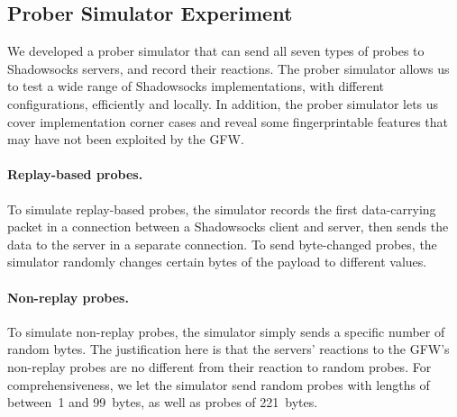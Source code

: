 \documentclass[sigconf,letterpaper]{acmart}
\begin{document}
\subsection{Prober Simulator Experiment}
\label{sec:intention-simulator}

We developed a prober simulator that can send all seven types of probes to Shadowsocks servers, and record their reactions.
The prober simulator allows us to test a wide range of Shadowsocks implementations,
with different configurations, efficiently and locally.
In addition, the prober simulator lets us cover implementation corner cases
and reveal some fingerprintable features that may have not been exploited by the GFW.

\paragraph{Replay-based probes.}
To simulate replay-based probes,
the simulator records the first data-carrying packet in a connection between a Shadowsocks client and server,
then sends the data to the server in a separate connection.
To send byte-changed probes,
the simulator randomly changes certain bytes of the payload to different values.

\paragraph{Non-replay probes.}
To simulate non-replay probes,
the simulator simply sends a specific number of random bytes.
The justification here is that the servers' reactions to
the GFW's non-replay probes are no different from their reaction to random probes.
For comprehensiveness,
we let the simulator send random probes with lengths of between~1 and 99~bytes,
as well as probes of 221~bytes.


\end{document}
